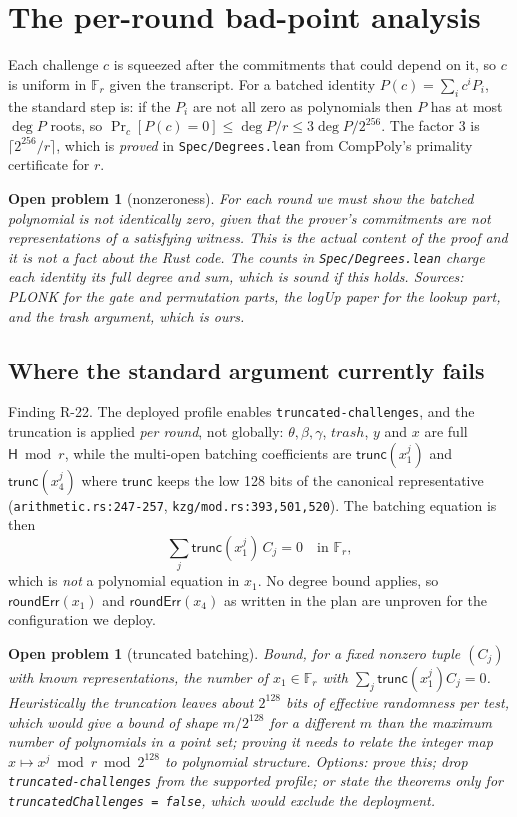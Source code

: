 \documentclass[11pt]{article}
\newtheorem{open}[theorem]{Open problem}
\newcommand{\Fr}{\mathbb{F}_r}
\newcommand{\Hash}{\mathsf{H}}
\begin{document}
\section{The per-round bad-point analysis}\label{sec:rounds}

Each challenge $c$ is squeezed after the commitments that could depend on it, so
$c$ is uniform in $\Fr$ given the transcript. For a batched identity
$P(c) = \sum_i c^i P_i$, the standard step is: if the $P_i$ are not all zero as
polynomials then $P$ has at most $\deg P$ roots, so
$\Pr_c[P(c)=0] \le \deg P / r \le 3\deg P/2^{256}$. The factor $3$ is
$\lceil 2^{256}/r\rceil$, which is \emph{proved} in \texttt{Spec/Degrees.lean}
from CompPoly's primality certificate for $r$.

\begin{open}[nonzeroness]\label{op:nonzero}
For each round we must show the batched polynomial is not identically zero, given
that the prover's commitments are not representations of a satisfying witness. This
is the actual content of the proof and it is not a fact about the Rust code. The
counts in \texttt{Spec/Degrees.lean} charge each identity its full degree and sum,
which is sound \emph{if} this holds. Sources: PLONK for the gate and permutation
parts, the logUp paper for the lookup part, and the trash argument, which is ours.
\end{open}

\subsection{Where the standard argument currently fails}\label{sec:truncation}

Finding R-22. The deployed profile enables \texttt{truncated-challenges}, and the
truncation is applied \emph{per round}, not globally: $\theta,\beta,\gamma$,
$\mathit{trash}$, $y$ and $x$ are full $\Hash \bmod r$, while the multi-open
batching coefficients are $\mathsf{trunc}(x_1^j)$ and $\mathsf{trunc}(x_4^j)$
where $\mathsf{trunc}$ keeps the low 128 bits of the canonical representative
(\texttt{arithmetic.rs:247-257}, \texttt{kzg/mod.rs:393,501,520}). The batching
equation is then
\[ \sum_j \mathsf{trunc}(x_1^j)\, C_j = 0 \quad\text{in } \Fr, \]
which is \emph{not} a polynomial equation in $x_1$. No degree bound applies, so
$\mathsf{roundErr}(x_1)$ and $\mathsf{roundErr}(x_4)$ as written in the plan are
unproven for the configuration we deploy.

\begin{open}[truncated batching]\label{op:trunc}
Bound, for a fixed nonzero tuple $(C_j)$ with known representations, the number of
$x_1 \in \Fr$ with $\sum_j \mathsf{trunc}(x_1^j) C_j = 0$. Heuristically the
truncation leaves about $2^{128}$ bits of effective randomness per test, which
would give a bound of shape $m/2^{128}$ for a different $m$ than the maximum number
of polynomials in a point set; proving it needs to relate the integer map
$x \mapsto x^j \bmod r \bmod 2^{128}$ to polynomial structure. Options: prove
this; drop \texttt{truncated-challenges} from the supported profile; or state the
theorems only for \texttt{truncatedChallenges = false}, which would exclude the
deployment.
\end{open}
\end{document}

